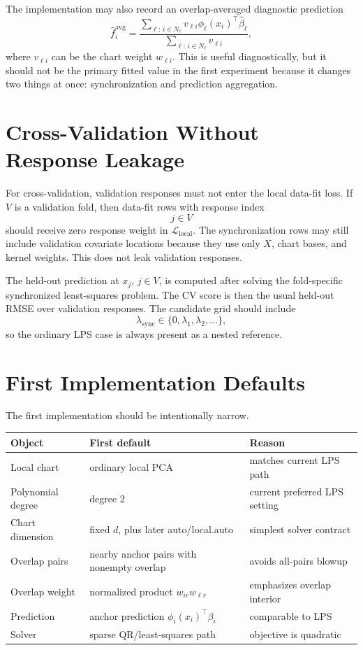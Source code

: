 \documentclass[11pt]{article}
\begin{document}
The implementation may also record an overlap-averaged diagnostic prediction
\[
  \widehat f_i^{\mathrm{avg}}
  =
  \frac{
    \sum_{\ell:\,i\in N_\ell} v_{\ell i}
    \phi_\ell(x_i)^\top\widehat\beta_\ell
  }{
    \sum_{\ell:\,i\in N_\ell} v_{\ell i}
  },
\]
where \(v_{\ell i}\) can be the chart weight \(w_{\ell i}\).  This is useful
diagnostically, but it should not be the primary fitted value in the first
experiment because it changes two things at once: synchronization and prediction
aggregation.

\section{Cross-Validation Without Response Leakage}

For cross-validation, validation responses must not enter the local data-fit
loss.  If \(V\) is a validation fold, then data-fit rows with response index
\[
  j\in V
\]
should receive zero response weight in
\(\mathcal L_{\mathrm{local}}\).  The synchronization rows may still include
validation covariate locations because they use only \(X\), chart bases, and
kernel weights.  This does not leak validation responses.

The held-out prediction at \(x_j\), \(j\in V\), is computed after solving the
fold-specific synchronized least-squares problem.  The CV score is then the
usual held-out RMSE over validation responses.  The candidate grid should
include
\[
  \lambda_{\mathrm{sync}}\in
  \{0,\lambda_1,\lambda_2,\ldots\},
\]
so the ordinary LPS case is always present as a nested reference.

\section{First Implementation Defaults}

The first implementation should be intentionally narrow.

\begin{center}
\begin{tabular}{@{}lll@{}}
\toprule
Object & First default & Reason \\
\midrule
Local chart & ordinary local PCA & matches current LPS path \\
Polynomial degree & degree \(2\) & current preferred LPS setting \\
Chart dimension & fixed \(d\), plus later auto/local.auto & simplest solver contract \\
Overlap pairs & nearby anchor pairs with nonempty overlap & avoids all-pairs blowup \\
Overlap weight & normalized product \(w_{ir}w_{\ell r}\) & emphasizes overlap interior \\
Prediction & anchor prediction \(\phi_i(x_i)^\top\beta_i\) & comparable to LPS \\
Solver & sparse QR/least-squares path & objective is quadratic \\
\bottomrule
\end{tabular}
\end{center}
\end{document}
